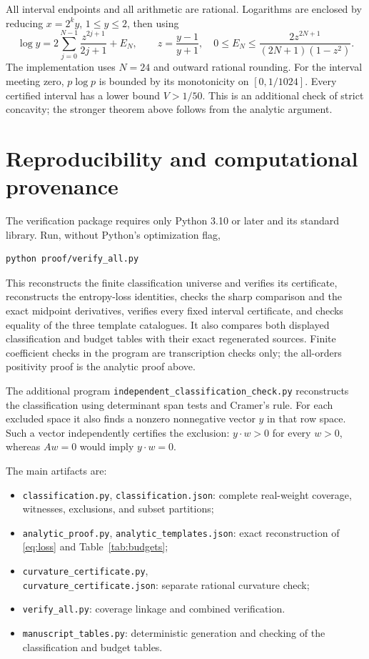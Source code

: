 \documentclass[11pt,a4paper]{article}
\begin{document}
All interval endpoints and all arithmetic are rational. Logarithms are
enclosed by reducing \(x=2^ky\), \(1\le y\le2\), then using
\[
 \log y=2\sum_{j=0}^{N-1}\frac{z^{2j+1}}{2j+1}+E_N,\qquad
 z=\frac{y-1}{y+1},\quad
 0\le E_N\le\frac{2z^{2N+1}}{(2N+1)(1-z^2)}.
\]
The implementation uses \(N=24\) and outward rational rounding.
For the interval meeting zero, \(p\log p\) is bounded by its monotonicity
on \([0,1/1024]\). Every certified interval has a lower bound
\(V>1/50\). This is an additional check of strict concavity;
the stronger theorem above follows from the analytic argument.

\section{Reproducibility and computational provenance}
The verification package requires only Python 3.10 or later and its
standard library. Run, without Python's optimization flag,
\begin{verbatim}
python proof/verify_all.py
\end{verbatim}
This reconstructs the finite classification universe and verifies its
certificate, reconstructs the entropy-loss identities, checks the sharp
comparison and the exact midpoint derivatives, verifies every fixed
interval certificate, and checks equality
of the three template catalogues. It also compares both displayed
classification and budget tables with their exact regenerated sources.
Finite coefficient checks in the program are transcription checks only;
the all-orders positivity proof is the analytic proof above.

The additional program \texttt{independent\_classification\_check.py}
reconstructs the classification using determinant span tests and Cramer's
rule. For each excluded space it also finds a nonzero nonnegative vector
\(y\) in that row space. Such a vector independently certifies the
exclusion: \(y\cdot w>0\) for every \(w>0\), whereas \(Aw=0\)
would imply \(y\cdot w=0\).

The main artifacts are:
\begin{itemize}
\item \texttt{classification.py}, \texttt{classification.json}:
complete real-weight coverage, witnesses, exclusions, and subset partitions;
\item \texttt{analytic\_proof.py}, \texttt{analytic\_templates.json}:
exact reconstruction of \eqref{eq:loss} and Table~\ref{tab:budgets};
\item \texttt{curvature\_certificate.py},\\
\texttt{curvature\_certificate.json}: separate rational curvature check;
\item \texttt{verify\_all.py}: coverage linkage and combined verification.
\item \texttt{manuscript\_tables.py}: deterministic generation and checking
of the classification and budget tables.
\end{itemize}
\end{document}
